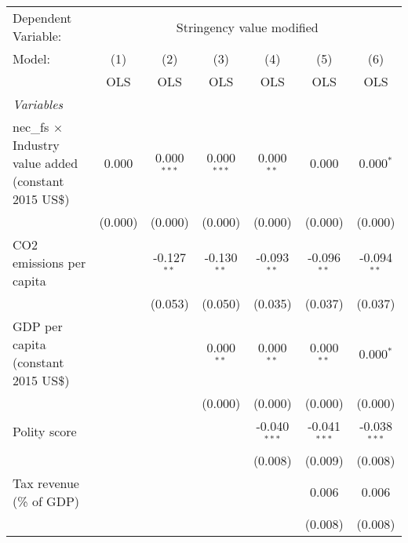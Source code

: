 
\begingroup
\centering
\begin{tabular}{lcccccc}
   \toprule
   Dependent Variable: & \multicolumn{6}{c}{Stringency value modified}\\
   Model:                                                        & (1)     & (2)           & (3)           & (4)            & (5)            & (6)\\  
                                                                 &  OLS    & OLS           & OLS           & OLS            & OLS            & OLS\\  
   \midrule
   \emph{Variables}\\
   nec\_fs $\times$ Industry value added (constant 2015 US\$)    & 0.000   & 0.000$^{***}$ & 0.000$^{***}$ & 0.000$^{**}$   & 0.000          & 0.000$^{*}$\\   
                                                                 & (0.000) & (0.000)       & (0.000)       & (0.000)        & (0.000)        & (0.000)\\   
   CO2 emissions per capita                                      &         & -0.127$^{**}$ & -0.130$^{**}$ & -0.093$^{**}$  & -0.096$^{**}$  & -0.094$^{**}$\\   
                                                                 &         & (0.053)       & (0.050)       & (0.035)        & (0.037)        & (0.037)\\   
   GDP per capita (constant 2015 US\$)                           &         &               & 0.000$^{**}$  & 0.000$^{**}$   & 0.000$^{**}$   & 0.000$^{*}$\\   
                                                                 &         &               & (0.000)       & (0.000)        & (0.000)        & (0.000)\\   
   Polity score                                                  &         &               &               & -0.040$^{***}$ & -0.041$^{***}$ & -0.038$^{***}$\\   
                                                                 &         &               &               & (0.008)        & (0.009)        & (0.008)\\   
   Tax revenue (\% of GDP)                                       &         &               &               &                & 0.006          & 0.006\\   
                                                                 &         &               &               &                & (0.008)        & (0.008)\\   

\end{tabular}
